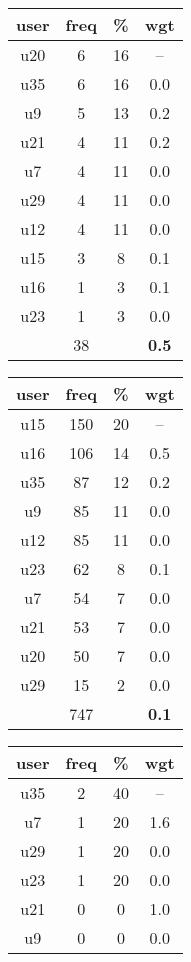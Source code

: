 \begin{table}
\centering
\begin{tabular}{ |c|c|c|c| }
	\hline
	\textbf{user} & \textbf{freq} & \textbf{\%} & \textbf{wgt} \\
	\hline
	u20 & 6 & 16 & -- \\
	u35 & 6 & 16 & 0.0 \\
	u9 & 5 & 13 & 0.2 \\
	u21 & 4 & 11 & 0.2 \\
	u7 & 4 & 11 & 0.0 \\
	u29 & 4 & 11 & 0.0 \\
	u12 & 4 & 11 & 0.0 \\
	u15 & 3 & 8 & 0.1 \\
	u16 & 1 & 3 & 0.1 \\
	u23 & 1 & 3 & 0.0 \\
	 & 38 & & \textbf{0.5} \\
	\hline
\end{tabular}
\begin{tabular}{ |c|c|c|c| }
	\hline
	\textbf{user} & \textbf{freq} & \textbf{\%} & \textbf{wgt} \\
	\hline
	u15 & 150 & 20 & -- \\
	u16 & 106 & 14 & 0.5 \\
	u35 & 87 & 12 & 0.2 \\
	u9 & 85 & 11 & 0.0 \\
	u12 & 85 & 11 & 0.0 \\
	u23 & 62 & 8 & 0.1 \\
	u7 & 54 & 7 & 0.0 \\
	u21 & 53 & 7 & 0.0 \\
	u20 & 50 & 7 & 0.0 \\
	u29 & 15 & 2 & 0.0 \\
	 & 747 & & \textbf{0.1} \\
	\hline
\end{tabular}
\begin{tabular}{ |c|c|c|c| }
	\hline
	\textbf{user} & \textbf{freq} & \textbf{\%} & \textbf{wgt} \\
	\hline
	u35 & 2 & 40 & -- \\
	u7 & 1 & 20 & 1.6 \\
	u29 & 1 & 20 & 0.0 \\
	u23 & 1 & 20 & 0.0 \\
	u21 & 0 & 0 & 1.0 \\
	u9 & 0 & 0 & 0.0 \\

\end{tabular}
\end{table}
